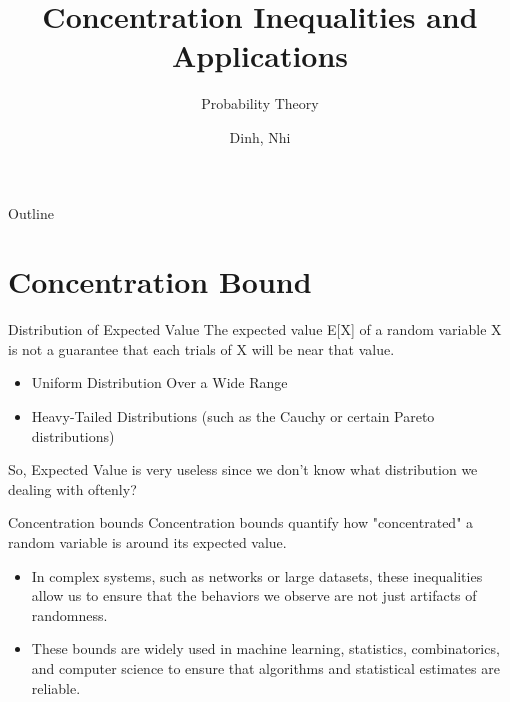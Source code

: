 \documentclass[aspectratio=169, handout]{beamer}
\title{Concentration Inequalities and Applications }
\subtitle{Probability Theory}
\author{Dinh, Nhi}
\date{}
\begin{document}

\begin{frame}
\titlepage
\end{frame}

\begin{frame}{Outline}
  \tableofcontents
\end{frame}


\section{Concentration Bound}
\frame{\sectionpage}

\begin{frame}{Distribution of Expected Value}
    The expected value E[X] of a random variable X is not a guarantee that each trials of X will be near that value. \pause
    \begin{itemize}
         \item Uniform Distribution Over a Wide Range
         \item Heavy-Tailed Distributions (such as the Cauchy or certain Pareto distributions) \pause
    \end{itemize}
    So, Expected Value is very useless since we don't know what distribution we dealing with oftenly? 
\end{frame}
\begin{frame}{Concentration bounds}
 Concentration bounds quantify how "concentrated" a random variable is around its expected value.\pause
    \begin{itemize}
        \item In complex systems, such as networks or large datasets, these inequalities allow us to ensure that the behaviors we observe are not just artifacts of randomness. \pause
        \item  These bounds are widely used in machine learning, statistics, combinatorics, and computer science to ensure that algorithms and statistical estimates are reliable.
    \end{itemize}

\end{frame}
\end{document}
